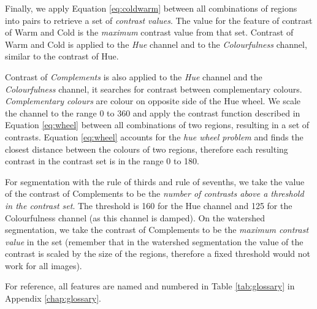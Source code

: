 \documentclass[11pt,a4paper,twoside,openright]{report}
\begin{document}
Finally, we apply Equation \ref{eq:coldwarm} between all combinations of
regions into pairs to retrieve a set of \emph{contrast values}.  The value for
the feature of contrast of Warm and Cold is the \emph{maximum} contrast value
from that set.  Contrast of Warm and Cold is applied to the \emph{Hue} channel
and to the \emph{Colourfulness} channel, similar to the contrast of Hue.

Contrast of \emph{Complements} is also applied to the \emph{Hue} channel and
the \emph{Colourfulness} channel, it searches for contrast between
complementary colours.  \emph{Complementary colours} are colour on opposite
side of the Hue wheel.  We scale the channel to the range 0 to 360 and apply
the contrast function described in Equation \ref{eq:wheel} between all
combinations of two regions, resulting in a set of contrasts.  Equation
\ref{eq:wheel} accounts for the \emph{hue wheel problem} and finds the closest
distance between the colours of two regions, therefore each resulting contrast
in the contrast set is in the range 0 to 180.

For segmentation with the rule of thirds and rule of sevenths, we take the
value of the contrast of Complements to be the \emph{number of contrasts above
a threshold in the contrast set}.  The threshold is 160 for the Hue channel and
125 for the Colourfulness channel (as this channel is damped).  On the
watershed segmentation, we take the contrast of Complements to be the
\emph{maximum contrast value} in the set (remember that in the watershed
segmentation the value of the contrast is scaled by the size of the regions,
therefore a fixed threshold would not work for all images).

For reference, all features are named and numbered in Table \ref{tab:glossary}
in Appendix \ref{chap:glossary}.

\end{document}
